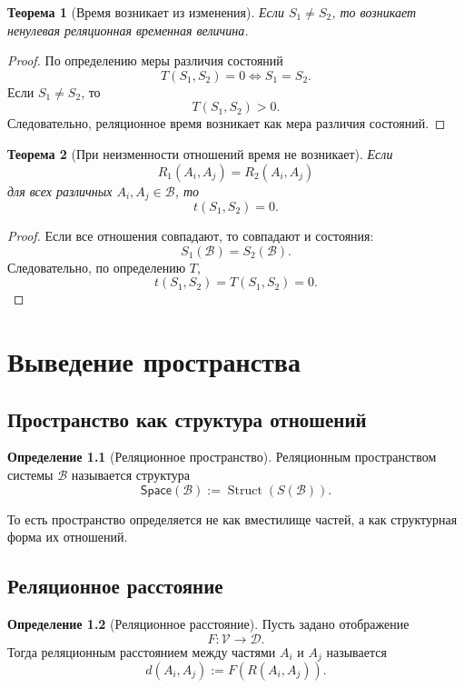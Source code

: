\documentclass[12pt,a4paper,oneside]{book}
\theoremstyle{definition}
\newtheorem{definition}{Определение}[chapter]
\theoremstyle{plain}
\newtheorem{theorem}{Теорема}[chapter]
\theoremstyle{remark}
\newcommand{\SubParts}{\mathcal B}
\newcommand{\Rel}{R}
\newcommand{\State}{S}
\newcommand{\Values}{\mathcal V}
\newcommand{\DistVals}{\mathcal D}
\newcommand{\Space}{\mathsf{Space}}
\newcommand{\Struct}{\operatorname{Struct}}
\begin{document}
\begin{theorem}[Время возникает из изменения]
Если \(\State_1\neq\State_2\), то возникает ненулевая реляционная временная величина.
\end{theorem}

\begin{proof}
По определению меры различия состояний
\[
T(\State_1,\State_2)=0 \iff \State_1=\State_2.
\]
Если \(\State_1\neq\State_2\), то
\[
T(\State_1,\State_2)>0.
\]
Следовательно, реляционное время возникает как мера различия состояний.
\end{proof}

\begin{theorem}[При неизменности отношений время не возникает]
Если
\[
\Rel_1(A_i,A_j)=\Rel_2(A_i,A_j)
\]
для всех различных \(A_i,A_j\in\SubParts\), то
\[
t(\State_1,\State_2)=0.
\]
\end{theorem}

\begin{proof}
Если все отношения совпадают, то совпадают и состояния:
\[
\State_1(\SubParts)=\State_2(\SubParts).
\]
Следовательно, по определению \(T\),
\[
t(\State_1,\State_2)=T(\State_1,\State_2)=0.
\]
\end{proof}

\chapter{Выведение пространства}

\section{Пространство как структура отношений}

\begin{definition}[Реляционное пространство]
Реляционным пространством системы \(\SubParts\) называется структура
\[
\Space(\SubParts):=\Struct(\State(\SubParts)).
\]
\end{definition}

То есть пространство определяется не как вместилище частей, а как структурная форма их отношений.

\section{Реляционное расстояние}

\begin{definition}[Реляционное расстояние]
Пусть задано отображение
\[
F:\Values\to\DistVals.
\]
Тогда реляционным расстоянием между частями \(A_i\) и \(A_j\) называется
\[
d(A_i,A_j):=F(\Rel(A_i,A_j)).
\]
\end{definition}
\end{document}

